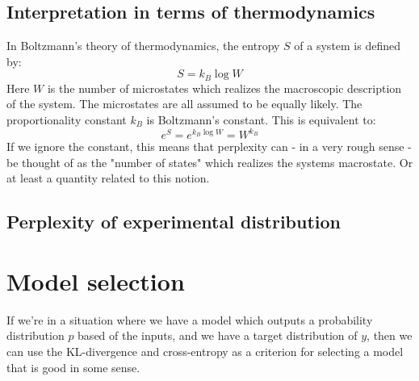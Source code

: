 \documentclass[12pt, a4paper]{article}
\numberwithin{equation}{section}
\begin{document}
\subsection{Interpretation in terms of thermodynamics}
In Boltzmann's theory of thermodynamics, the entropy $S$ of a system is defined by:
\begin{equation}
S=k_B\log W
\end{equation}
Here $W$ is the number of microstates which realizes the macroscopic description of the system. The microstates are all assumed to be equally likely. The proportionality constant $k_B$ is Boltzmann's constant. This is equivalent to:
\begin{equation}
e^S=e^{k_B\log W}=W^{k_B}
\end{equation}
If we ignore the constant, this means that perplexity can - in a very rough sense - be thought of as the "number of states" which realizes the systems macrostate. Or at least a quantity related to this notion.

\subsection{Perplexity of experimental distribution}



\section{Model selection}
If we're in a situation where we have a model which outputs a probability distribution $p$ based of the inputs, and we have a target distribution of $y$, then we can use the KL-divergence and cross-entropy as a criterion for selecting a model that is good in some sense.
\end{document}
